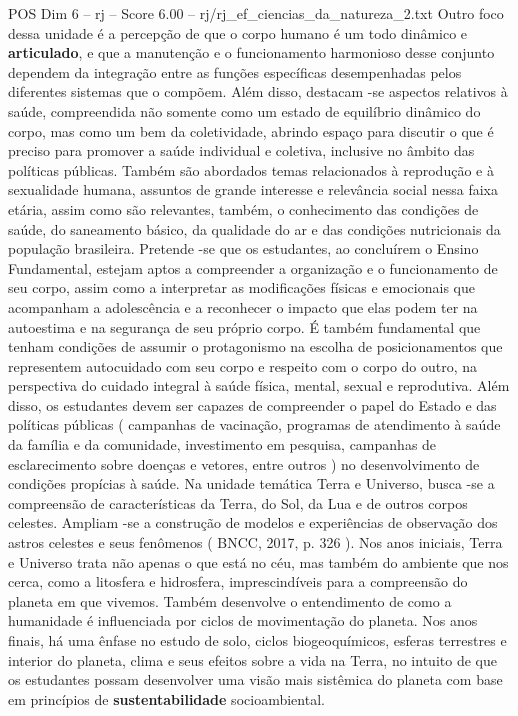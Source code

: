 \begin{textsample}{POS Dim 6 – rj – Score 6.00 – rj/rj\_ef\_ciencias\_da\_natureza\_2.txt}
Outro foco dessa unidade é a percepção de que o corpo humano é um todo dinâmico e \textbf{articulado}, e que a manutenção e o funcionamento harmonioso desse conjunto dependem da integração entre as funções específicas desempenhadas pelos diferentes sistemas que o compõem.
Além disso, destacam -se aspectos relativos à saúde, compreendida não somente como um estado de equilíbrio dinâmico do corpo, mas como um bem da coletividade, abrindo espaço para discutir o que é preciso para promover a saúde individual e coletiva, inclusive no âmbito das políticas públicas.
Também são abordados temas relacionados à reprodução e à sexualidade humana, assuntos de grande interesse e relevância social nessa faixa etária, assim como são relevantes, também, o conhecimento das condições de saúde, do saneamento básico, da qualidade do ar e das condições nutricionais da população brasileira.
Pretende -se que os estudantes, ao concluírem o Ensino Fundamental, estejam aptos a compreender a organização e o funcionamento de seu corpo, assim como a interpretar as modificações físicas e emocionais que acompanham a adolescência e a reconhecer o impacto que elas podem ter na autoestima e na segurança de seu próprio corpo.
É também fundamental que tenham condições de assumir o protagonismo na escolha de posicionamentos que representem autocuidado com seu corpo e respeito com o corpo do outro, na perspectiva do cuidado integral à saúde física, mental, sexual e reprodutiva.
Além disso, os estudantes devem ser capazes de compreender o papel do Estado e das políticas públicas ( campanhas de vacinação, programas de atendimento à saúde da família e da comunidade, investimento em pesquisa, campanhas de esclarecimento sobre doenças e vetores, entre outros ) no desenvolvimento de condições propícias à saúde.
Na unidade temática Terra e Universo, busca -se a compreensão de características da Terra, do Sol, da Lua e de outros corpos celestes.
Ampliam -se a construção de modelos e experiências de observação dos astros celestes e seus fenômenos ( BNCC, 2017, p. 326 ).
Nos anos iniciais, Terra e Universo trata não apenas o que está no céu, mas também do ambiente que nos cerca, como a litosfera e hidrosfera, imprescindíveis para a compreensão do planeta em que vivemos.
Também desenvolve o entendimento de como a humanidade é influenciada por ciclos de movimentação do planeta.
Nos anos finais, há uma ênfase no estudo de solo, ciclos biogeoquímicos, esferas terrestres e interior do planeta, clima e seus efeitos sobre a vida na Terra, no intuito de que os estudantes possam desenvolver uma visão mais sistêmica do planeta com base em princípios de \textbf{sustentabilidade} socioambiental.

\end{textsample}
